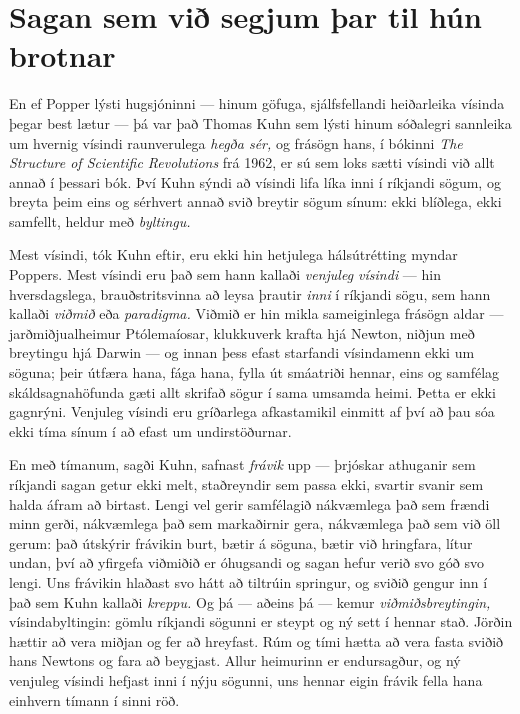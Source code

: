 \section*{Sagan sem við segjum þar til hún brotnar}

En ef Popper lýsti hugsjóninni — hinum göfuga, sjálfsfellandi heiðarleika vísinda þegar best lætur — þá var það Thomas Kuhn sem lýsti hinum sóðalegri sannleika um hvernig vísindi raunverulega \emph{hegða sér,} og frásögn hans, í bókinni \emph{The Structure of Scientific Revolutions} frá 1962, er sú sem loks sætti vísindi við allt annað í þessari bók. Því Kuhn sýndi að vísindi lifa líka inni í ríkjandi sögum, og breyta þeim eins og sérhvert annað svið breytir sögum sínum: ekki blíðlega, ekki samfellt, heldur með \emph{byltingu.}

Mest vísindi, tók Kuhn eftir, eru ekki hin hetjulega hálsútrétting myndar Poppers. Mest vísindi eru það sem hann kallaði \emph{venjuleg vísindi} — hin hversdagslega, brauðstritsvinna að leysa þrautir \emph{inni} í ríkjandi sögu, sem hann kallaði \emph{viðmið} eða \emph{paradigma.} Viðmið er hin mikla sameiginlega frásögn aldar — jarðmiðjualheimur Ptólemaíosar, klukkuverk krafta hjá Newton, niðjun með breytingu hjá Darwin — og innan þess efast starfandi vísindamenn ekki um söguna; þeir útfæra hana, fága hana, fylla út smáatriði hennar, eins og samfélag skáldsagnahöfunda gæti allt skrifað sögur í sama umsamda heimi. Þetta er ekki gagnrýni. Venjuleg vísindi eru gríðarlega afkastamikil einmitt af því að þau sóa ekki tíma sínum í að efast um undirstöðurnar.

En með tímanum, sagði Kuhn, safnast \emph{frávik} upp — þrjóskar athuganir sem ríkjandi sagan getur ekki melt, staðreyndir sem passa ekki, svartir svanir sem halda áfram að birtast. Lengi vel gerir samfélagið nákvæmlega það sem frændi minn gerði, nákvæmlega það sem markaðirnir gera, nákvæmlega það sem við öll gerum: það útskýrir frávikin burt, bætir á söguna, bætir við hringfara, lítur undan, því að yfirgefa viðmiðið er óhugsandi og sagan hefur verið svo góð svo lengi. Uns frávikin hlaðast svo hátt að tiltrúin springur, og sviðið gengur inn í það sem Kuhn kallaði \emph{kreppu.} Og þá — aðeins þá — kemur \emph{viðmiðsbreytingin,} vísindabyltingin: gömlu ríkjandi sögunni er steypt og ný sett í hennar stað. Jörðin hættir að vera miðjan og fer að hreyfast. Rúm og tími hætta að vera fasta sviðið hans Newtons og fara að beygjast. Allur heimurinn er endursagður, og ný venjuleg vísindi hefjast inni í nýju sögunni, uns hennar eigin frávik fella hana einhvern tímann í sinni röð.

